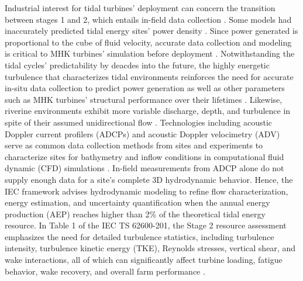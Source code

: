 \documentclass[12pt,sort&compress]{elsarticle}
\theoremstyle{definition}%
\begin{document}
Industrial interest for tidal turbines' deployment can concern the transition between stages 1 and 2, which entails in-field data collection \cite{[gooch_2009]}. Some models had inaccurately predicted tidal energy sites' power density \cite{kilcher_tidal_2023}. Since power generated is proportional to the cube of fluid velocity, accurate data collection and modeling is critical to MHK turbines' simulation before deployment \cite{[korotenko_2019]}. Notwithstanding the tidal cycles' predictability by deacdes into the future, the highly energetic turbulence that characterizes tidal environments reinforces the need for accurate in-situ data collection to predict power generation as well as other parameters such as MHK turbines' structural performance over their lifetimes \cite{[deb_2025], lieber_2024], [greenwood_2019],[neary_2011]}. Likewise, riverine environments exhibit more variable discharge, depth, and turbulence in spite of their assumed unidirectional flow \cite{[neary_2011]}. Technologies including acoustic Doppler current profilers (ADCPs) and acoustic Doppler velocimetry (ADV) serve as common data collection methods from sites and experiments to characterize sites for bathymetry and inflow conditions in computational fluid dynamic (CFD) simulations \cite{[gargett_1994], [levine_2009], [gooch_2009], [thomson_2010], [stevens_2012], [thomson_2012], [mycek_2014],[guion_2014], [korotenko_2019], [ouro_2019], [keenan_2024], [karsten_2024], deb_2025], [mcvey_2026]}. In-field measurements from ADCP alone do not supply enough data for a site's complete 3D hydrodynamic behavior. Hence, the IEC framework advises hydrodynamic modeling to refine flow characterization, energy estimation, and uncertainty quantification when the annual energy production (AEP) reaches higher than 2\% of the theoretical tidal energy resource\cite{noauthor_iec_nodate}. In Table 1 of the IEC TS 62600-201, the Stage 2 resource assessment emphasizes the need for detailed turbulence statistics, including turbulence intensity, turbulence kinetic energy (TKE), Reynolds stresses, vertical shear, and wake interactions, all of which can significantly affect turbine loading, fatigue behavior, wake recovery, and overall farm performance \cite{noauthor_iec_nodate}.


\end{document}
